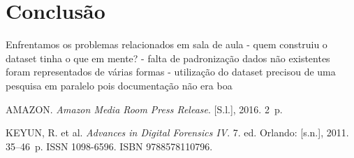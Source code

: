 \documentclass[conference]{IEEEtran}
\begin{document}
\section{Conclusão}

Enfrentamos os problemas relacionados em sala de aula
- quem construiu o dataset tinha o que em mente?
- falta de padronização dados não existentes foram representados de várias formas
- utilização do dataset precisou de uma pesquisa em paralelo pois documentação não era boa



%
%
%
\begin{thebibliography}{1}

{AMAZON. \emph{{Amazon Media Room Press Release}}.
[S.l.], 2016. 2~p.}

{KEYUN, R. et al. \emph{{Advances in Digital Forensics IV}}. 7. ed. Orlando:
  [s.n.], 2011. 35--46~p.
ISSN 1098-6596.
ISBN 9788578110796.}

\end{thebibliography}

\end{document}
